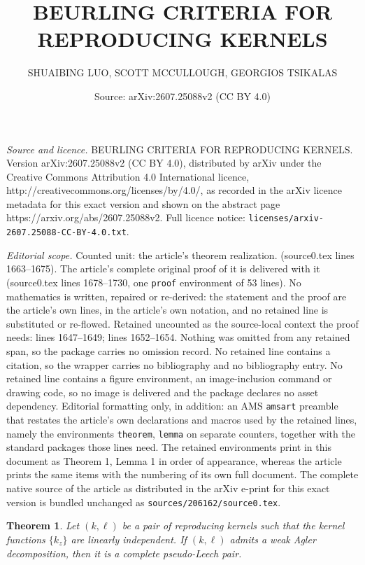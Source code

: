 \documentclass[10pt,a4paper]{amsart}
\title{\large BEURLING CRITERIA FOR REPRODUCING KERNELS}
\author{SHUAIBING LUO, SCOTT MCCULLOUGH, GEORGIOS TSIKALAS}
\date{Source: arXiv:2607.25088v2 (CC BY 4.0)}
\newtheorem{theorem}{Theorem}
\begin{document}
\maketitle

\noindent\emph{Source and licence.} \large BEURLING CRITERIA FOR REPRODUCING KERNELS. Version arXiv:2607.25088v2 (CC BY 4.0), distributed by arXiv under the Creative Commons Attribution 4.0 International licence, http://creativecommons.org/licenses/by/4.0/, as recorded in the arXiv licence metadata for this exact version and shown on the abstract page https://arxiv.org/abs/2607.25088v2. Full licence notice: \texttt{licenses/arxiv-2607.25088-CC-BY-4.0.txt}.\par\smallskip

\noindent\textit{Editorial scope.} Counted unit: the article's theorem realization. (source0.tex lines 1663--1675). The article's complete original proof of it is delivered with it (source0.tex lines 1678--1730, one \texttt{proof} environment of 53 lines). No mathematics is written, repaired or re-derived: the statement and the proof are the article's own lines, in the article's own notation, and no retained line is substituted or re-flowed.  Retained uncounted as the source-local context the proof needs: lines 1647--1649; lines 1652--1654.  Nothing was omitted from any retained span, so the package carries no omission record.  No retained line contains a citation, so the wrapper carries no bibliography and no bibliography entry.  No retained line contains a figure environment, an image-inclusion command or drawing code, so no image is delivered and the package declares no asset dependency.  Editorial formatting only, in addition: an AMS \texttt{amsart} preamble that restates the article's own declarations and macros used by the retained lines, namely the environments \texttt{theorem}, \texttt{lemma} on separate counters, together with the standard packages those lines need.  The retained environments print in this document as Theorem 1, Lemma 1 in order of appearance, whereas the article prints the same items with the numbering of its own full document.  The complete native source of the article as distributed in the arXiv e-print for this exact version is bundled unchanged as \texttt{sources/206162/source0.tex}.
\begin{theorem}\label{AglerdectoLeech}
Let $(k, \ell)$ be a pair of reproducing kernels such that the kernel functions $\{k_z\}$ are linearly independent. If $(k, \ell)$ admits a weak Agler decomposition, then it is a complete pseudo-Leech pair.
\end{theorem}
\end{document}
